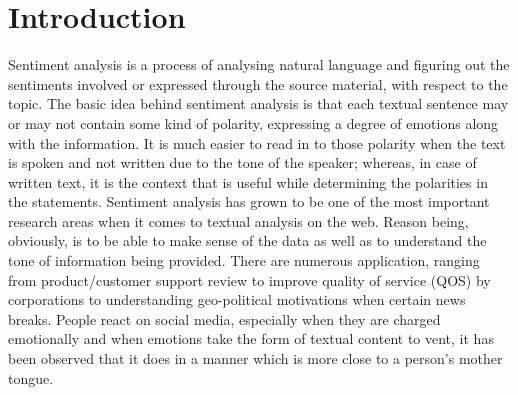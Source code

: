\documentclass[conference]{IEEEtran}
\begin{document}




%
\IEEEpeerreviewmaketitle



\section{Introduction}
Sentiment analysis is a process of analysing natural language and figuring out
the sentiments involved or expressed through the source material, with respect
to the topic. The basic idea behind sentiment analysis is that each textual
sentence may or may not contain some kind of polarity, expressing a degree of
emotions along with the information. It is much easier to read in to those
polarity when the text is spoken and not written due to the tone of the
speaker; whereas, in case of written text, it is the context that is useful
while determining the polarities in the statements. Sentiment analysis has
grown to be one of the most important research areas when it comes to textual
analysis on the web. Reason being, obviously, is to be able to make sense of
the data as well as to understand the tone of information being provided. There
are numerous application, ranging from product/customer support review to
improve quality of service (QOS) by corporations to understanding geo-political
motivations when certain news breaks. People react on social media, especially
when they are charged emotionally and when emotions take the form of textual
content to vent, it has been observed that it does in a manner which is more
close to a person's mother tongue.\\
\end{document}
